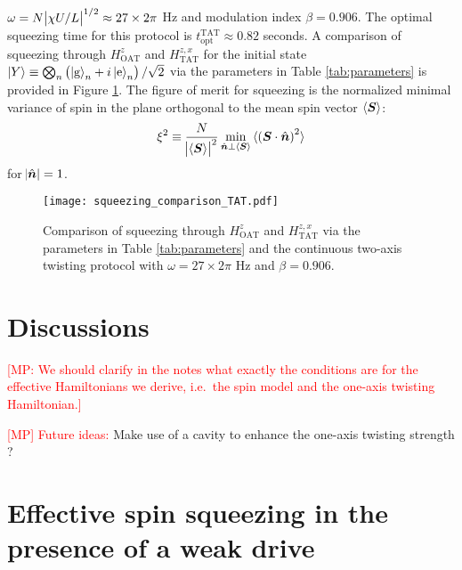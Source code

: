 \documentclass[aps,notitlepage,nofootinbib,11pt]{revtex4-1}
\renewcommand{\t}{\text} %
\newcommand{\f}[2]{\dfrac{#1}{#2}} %
\newcommand{\p}[1]{\left(#1\right)} %
\renewcommand{\v}{\bm} %
\renewcommand{\c}{\cdot} %
\newcommand{\bk}{\braket} %
\newcommand{\g}{\text{g}} %
\newcommand{\e}{\text{e}}
\newcommand{\1}{\mathds{1}}
\newcommand{\note}[1]{\textcolor{red}{#1}}
\begin{document}
$\omega=N\abs{\chi U/L}^{1/2}\approx27\times2\pi$ Hz and modulation
index $\beta=0.906$.  The optimal squeezing time for this protocol is
$t_{\t{opt}}^{\t{TAT}}\approx0.82$ seconds.  A comparison of squeezing
through $H_{\t{OAT}}^z$ and $H_{\t{TAT}}^{z,x}$ for the initial state
$\ket{Y}\equiv\bigotimes_n\p{\ket{\g}_n+i\ket{\e}_n}/\sqrt2$ via the
parameters in Table \ref{tab:parameters} is provided in Figure
\ref{fig:squeezing_comparison}.  The figure of merit for squeezing is
the normalized minimal variance of spin in the plane orthogonal to the
mean spin vector $\bk{\v S}$:
\begin{align}
  \xi^2 \equiv \f{N}{\abs{\bk{\v S}}^2}
  \min_{\hat{\v n}\perp\bk{\v S}} \bk{\p{\v S\c\hat{\v n}}^2}
\end{align}
for $\abs{\hat{\v n}}=1$.

\begin{figure}
  \centering \texttt{[image: squeezing\_comparison\_TAT.pdf]}
  \caption{Comparison of squeezing through $H_{\t{OAT}}^z$ and
    $H_{\t{TAT}}^{z,x}$ via the parameters in Table
    \ref{tab:parameters} and the continuous two-axis twisting protocol
    with $\omega=27\times2\pi$ Hz and $\beta=0.906$.}
  \label{fig:squeezing_comparison}
\end{figure}





\section{Discussions}

\note{[MP: We should clarify in the notes what exactly the conditions
  are for the effective Hamiltonians we derive, i.e.~the spin model
  and the one-axis twisting Hamiltonian.]}

\note{[MP] Future ideas:} Make use of a cavity to enhance the one-axis
twisting strength \cite{hu2017vacuum}?


\appendix

\section{Effective spin squeezing in the presence of a weak drive}
\label{sec:squeezing_derivation}
\end{document}
